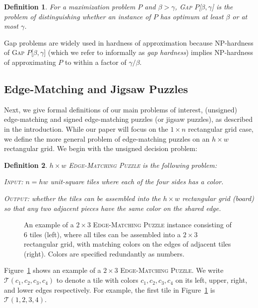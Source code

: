 \documentclass[11pt]{article}
\newtheorem{definition}{Definition}
\def\Gap#1{\textsc{Gap} #1}
\begin{document}
\begin{definition}
For a maximization problem $P$ and $\beta > \gamma$, \Gap{$P$}[$\beta, \gamma$] is the problem of distinguishing whether an instance of $P$ has optimum at least $\beta$ or at most $\gamma$.
\end{definition}

Gap problems are widely used in hardness of approximation because NP-hardness of \Gap{$P$}[$\beta, \gamma$] (which we refer to informally as \emph{gap hardness}) implies NP-hardness of approximating $P$ to within a factor of $\gamma/\beta$.

\subsection{Edge-Matching and Jigsaw Puzzles}

Next, we give formal definitions of our main problems of interest, (unsigned) edge-matching and signed edge-matching puzzles (or jigsaw puzzles), as described in the introduction.
While our paper will focus on the $1 \times n$ rectangular grid case,
we define the more general problem of edge-matching puzzles on an $h \times w$
rectangular grid.
We begin with the unsigned decision problem:

\begin{definition}
	\textsc{$h \times w$ Edge-Matching Puzzle} is the following problem:

	\textsc{Input:} $n = h w$ unit-square tiles where each of the four sides has a color.

	\textsc{Output:} whether the tiles can be assembled into the $h \times w$ rectangular grid (board) so that any two adjacent pieces have the same color on the shared edge.
\end{definition}

\begin{figure}
	\centering
	\begin{subfigure}[c]{\textwidth}
		\centering
		\scalebox{0.8}{}
	\end{subfigure}
	\caption{An example of a \textsc{$2 \times 3$ Edge-Matching Puzzle} instance consisting of $6$ tiles (left), where all tiles can be assembled into a $2 \times 3$ rectangular grid, with matching colors on the edges of adjacent tiles (right). Colors are specified redundantly as numbers.}
	\label{fig:2x3-feasible}
\end{figure}

Figure~\ref{fig:2x3-feasible} shows an example of a \textsc{$2 \times 3$ Edge-Matching Puzzle}.
We write $\mathcal{T}(c_1, c_2, c_3, c_4)$ to denote a tile with colors $c_1, c_2, c_3, c_4$ on its left, upper, right, and lower edges respectively.
For example, the first tile in Figure~\ref{fig:2x3-feasible} is $\mathcal{T}(1,2,3,4)$.
\end{document}
